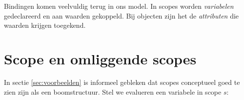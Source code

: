 
Bindingen komen veelvuldig terug in ons model. In scopes worden \emph{variabelen} gedeclareerd en aan waarden gekoppeld. Bij objecten zijn het de \emph{attributen} die waarden krijgen toegekend.

\section{Scope en omliggende scopes}

In sectie \ref{sec:voorbeelden} is informeel gebleken dat scopes conceptueel goed te zien zijn als een boomstructuur. Stel we evalueren een variabele  in scope $s$:

